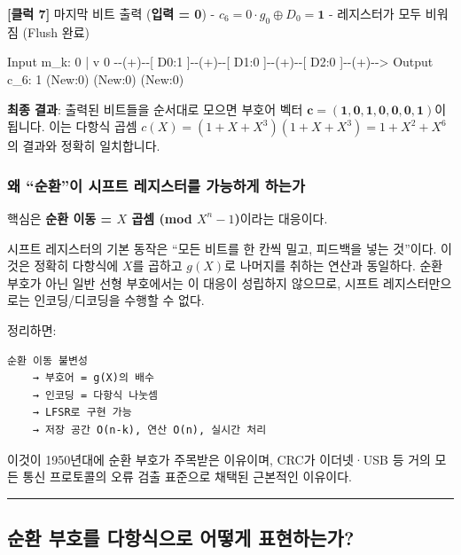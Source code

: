 \documentclass[
  oneside]{article}
\newenvironment{Shaded}{}{}
\newcommand{\NormalTok}[1]{#1}
\begin{document}
\textbf{{[}클럭 7{]}} 마지막 비트 출력 (\textbf{입력 = 0}) -
\(c_6 = 0 \cdot g_0 \oplus D_0 = \mathbf{1}\) - 레지스터가 모두 비워짐
(Flush 완료)

\begin{Shaded}
\begin{Highlighting}[]
\NormalTok{  Input m\_k: 0}
\NormalTok{       |}
\NormalTok{       v}
\NormalTok{  0 {-}{-}(+){-}{-}[ D0:1 ]{-}{-}(+){-}{-}[ D1:0 ]{-}{-}(+){-}{-}[ D2:0 ]{-}{-}(+){-}{-}\textgreater{} Output c\_6: 1}
\NormalTok{           (New:0)        (New:0)        (New:0)}
\end{Highlighting}
\end{Shaded}

\textbf{최종 결과}: 출력된 비트들을 순서대로 모으면 부호어 벡터
\(\mathbf{c} = (\mathbf{1, 0, 1, 0, 0, 0, 1})\)이 됩니다. 이는 다항식
곱셈 \(c(X) = (1+X+X^3)(1+X+X^3) = 1 + X^2 + X^6\)의 결과와 정확히
일치합니다.

\subsubsection{왜 ``순환''이 시프트 레지스터를 가능하게
하는가}\label{uxc65c-uxc21cuxd658uxc774-uxc2dcuxd504uxd2b8-uxb808uxc9c0uxc2a4uxd130uxb97c-uxac00uxb2a5uxd558uxac8c-uxd558uxb294uxac00}

핵심은 \textbf{순환 이동 = \(X\) 곱셈 (mod \(X^n - 1\))}이라는 대응이다.

시프트 레지스터의 기본 동작은 ``모든 비트를 한 칸씩 밀고, 피드백을 넣는
것''이다. 이것은 정확히 다항식에 \(X\)를 곱하고 \(g(X)\)로 나머지를
취하는 연산과 동일하다. 순환 부호가 아닌 일반 선형 부호에서는 이 대응이
성립하지 않으므로, 시프트 레지스터만으로는 인코딩/디코딩을 수행할 수
없다.

정리하면:

\begin{verbatim}
순환 이동 불변성
    → 부호어 = g(X)의 배수
    → 인코딩 = 다항식 나눗셈
    → LFSR로 구현 가능
    → 저장 공간 O(n-k), 연산 O(n), 실시간 처리
\end{verbatim}

이것이 1950년대에 순환 부호가 주목받은 이유이며, CRC가 이더넷·USB 등
거의 모든 통신 프로토콜의 오류 검출 표준으로 채택된 근본적인 이유이다.

\begin{center}\rule{0.5\linewidth}{0.5pt}\end{center}

\subsection{순환 부호를 다항식으로 어떻게
표현하는가?}\label{uxc21cuxd658-uxbd80uxd638uxb97c-uxb2e4uxd56duxc2dduxc73cuxb85c-uxc5b4uxb5bbuxac8c-uxd45cuxd604uxd558uxb294uxac00}
\end{document}
